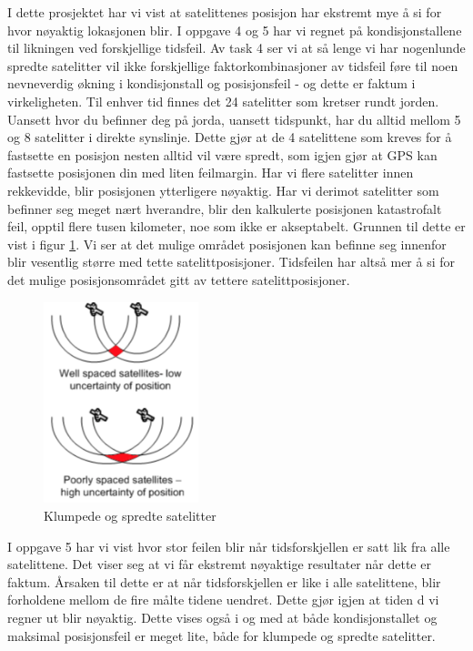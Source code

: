 I dette prosjektet har vi vist at satelittenes posisjon har ekstremt mye å si for hvor nøyaktig lokasjonen blir. I oppgave 4 og 5 har vi regnet på kondisjonstallene til likningen ved forskjellige tidsfeil. Av task 4 ser vi at så lenge vi har nogenlunde spredte satelitter vil ikke forskjellige faktorkombinasjoner av tidsfeil føre til noen nevneverdig økning i kondisjonstall og posisjonsfeil - og dette er faktum i virkeligheten. Til enhver tid finnes det 24 satelitter som kretser rundt jorden. Uansett hvor du befinner deg på jorda, uansett tidspunkt, har du alltid mellom 5 og 8 satelitter i direkte synslinje. Dette gjør at de 4 satelittene som kreves for å fastsette en posisjon nesten alltid vil være spredt, som igjen gjør at GPS kan fastsette posisjonen din med liten feilmargin. Har vi flere satelitter innen rekkevidde, blir posisjonen ytterligere nøyaktig. Har vi derimot satelitter som befinner seg meget nært hverandre, blir den kalkulerte posisjonen katastrofalt feil, opptil flere tusen kilometer, noe som ikke er akseptabelt. Grunnen til dette er vist i figur \ref{fig:bunchedsat}. Vi ser at det mulige området posisjonen kan befinne seg innenfor blir vesentlig større med tette satelittposisjoner. Tidsfeilen har altså mer å si for det mulige posisjonsområdet gitt av tettere satelittposisjoner.

\begin{figure}[htbp]
	\centering
	\includegraphics[width=0.4\textwidth]{sections/Conclusion/bunchedsat.png}
	\caption{Klumpede og spredte satelitter}
	\label{fig:bunchedsat}
\end{figure}

I oppgave 5 har vi vist hvor stor feilen blir når tidsforskjellen er satt lik fra alle satelittene. Det viser seg at vi får ekstremt nøyaktige resultater når dette er faktum. Årsaken til dette er at når tidsforskjellen er like i alle satelittene, blir forholdene mellom de fire målte tidene uendret. Dette gjør igjen at tiden d vi regner ut blir nøyaktig. Dette vises også i og med at både kondisjonstallet og maksimal posisjonsfeil er meget lite, både for klumpede og spredte satelitter. 

